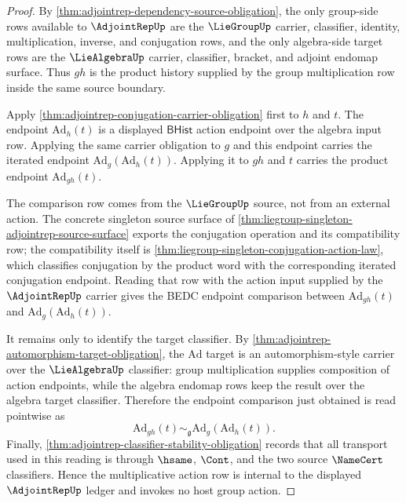 \begin{proof}
By \autoref{thm:adjointrep-dependency-source-obligation}, the only group-side rows available to $\AdjointRepUp$ are the $\LieGroupUp$ carrier, classifier, identity, multiplication, inverse, and conjugation rows, and the only algebra-side target rows are the $\LieAlgebraUp$ carrier, classifier, bracket, and adjoint endomap surface. Thus $gh$ is the product history supplied by the group multiplication row inside the same source boundary.

Apply \autoref{thm:adjointrep-conjugation-carrier-obligation} first to $h$ and $t$. The endpoint $\mathrm{Ad}_{h}(t)$ is a displayed $\mathsf{BHist}$ action endpoint over the algebra input row. Applying the same carrier obligation to $g$ and this endpoint carries the iterated endpoint $\mathrm{Ad}_{g}(\mathrm{Ad}_{h}(t))$. Applying it to $gh$ and $t$ carries the product endpoint $\mathrm{Ad}_{gh}(t)$.

The comparison row comes from the $\LieGroupUp$ source, not from an external action. The concrete singleton source surface of \autoref{thm:liegroup-singleton-adjointrep-source-surface} exports the conjugation operation and its compatibility row; the compatibility itself is \autoref{thm:liegroup-singleton-conjugation-action-law}, which classifies conjugation by the product word with the corresponding iterated conjugation endpoint. Reading that row with the action input supplied by the $\AdjointRepUp$ carrier gives the BEDC endpoint comparison between $\mathrm{Ad}_{gh}(t)$ and $\mathrm{Ad}_{g}(\mathrm{Ad}_{h}(t))$.

It remains only to identify the target classifier. By \autoref{thm:adjointrep-automorphism-target-obligation}, the $\mathrm{Ad}$ target is an automorphism-style carrier over the $\LieAlgebraUp$ classifier: group multiplication supplies composition of action endpoints, while the algebra endomap rows keep the result over the algebra target classifier. Therefore the endpoint comparison just obtained is read pointwise as
$$
\mathrm{Ad}_{gh}(t)\sim_{\mathfrak g}\mathrm{Ad}_{g}(\mathrm{Ad}_{h}(t)).
$$
Finally, \autoref{thm:adjointrep-classifier-stability-obligation} records that all transport used in this reading is through $\hsame$, $\Cont$, and the two source $\NameCert$ classifiers. Hence the multiplicative action row is internal to the displayed $\AdjointRepUp$ ledger and invokes no host group action.
\end{proof}
